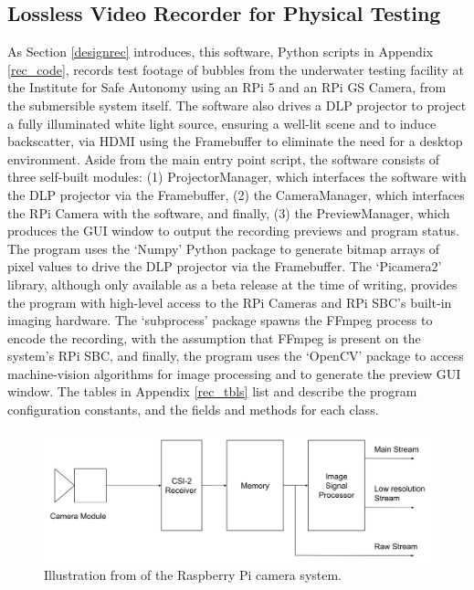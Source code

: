 \subsection{Lossless Video Recorder for Physical Testing}
\label{pirec_impl}

As Section \ref{designrec} introduces, this software, Python scripts in Appendix \ref{rec_code}, records test footage of bubbles from the underwater testing facility at the Institute for Safe Autonomy using an RPi 5 and an RPi GS Camera, from the submersible system itself. The software also drives a DLP projector to project a fully illuminated white light source, ensuring a well-lit scene and to induce backscatter, via HDMI using the Framebuffer to eliminate the need for a desktop environment. Aside from the main entry point script, the software consists of three self-built modules: (1) ProjectorManager, which interfaces the software with the DLP projector via the Framebuffer, (2) the CameraManager, which interfaces the RPi Camera with the software, and finally, (3) the PreviewManager, which produces the GUI window to output the recording previews and program status. The program uses the `Numpy' Python package to generate bitmap arrays of pixel values to drive the DLP projector via the Framebuffer. The `Picamera2' library, although only available as a beta release at the time of writing, provides the program with high-level access to the RPi Cameras and RPi SBC's built-in imaging hardware. The `subprocess' package spawns the FFmpeg process to encode the recording, with the assumption that FFmpeg is present on the system's RPi SBC, and finally, the program uses the `OpenCV' package to access machine-vision algorithms for image processing and to generate the preview GUI window. The tables in Appendix \ref{rec_tbls} list and describe the program configuration constants, and the fields and methods for each class.

\begin{figure}[H]
    \centering
    \includegraphics[width=1\textwidth]{assets/picamera-system.png}
    \caption{Illustration from \cite{raspberrypiltdPicamera2Library2024} of the Raspberry Pi camera system.}
    \label{fig:picam_system}
\end{figure}

